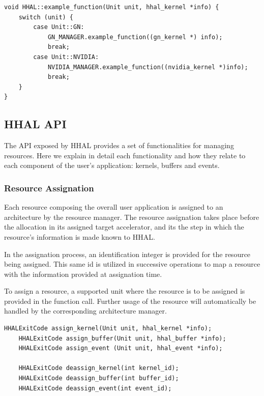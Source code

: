 \begin{lstlisting}[style=CStyle, caption=HHAL API Example - Dispatching architecture-specific structures]
void HHAL::example_function(Unit unit, hhal_kernel *info) {
    switch (unit) {
        case Unit::GN:
            GN_MANAGER.example_function((gn_kernel *) info);
            break;
        case Unit::NVIDIA:
            NVIDIA_MANAGER.example_function((nvidia_kernel *)info);
            break;
    }
}
\end{lstlisting}

\subsection{HHAL API}

The API exposed by HHAL provides a set of functionalities for managing resources. Here we explain in detail each functionality and how they relate to each component of the user's application: kernels, buffers and events.

\subsubsection{Resource Assignation}

Each resource composing the overall user application is assigned to an architecture by the resource manager. The resource assignation takes place before the allocation in its assigned target accelerator, and its the step in which the resource's information is made known to HHAL.

In the assignation process, an identification integer is provided for the resource being assigned. This same id is utilized in successive operations to map a resource with the information provided at assignation time.

To assign a resource, a supported unit where the resource is to be assigned is provided in the function call. Further usage of the resource will automatically be handled by the corresponding architecture manager.

\begin{lstlisting}[style=CStyle, caption=HHAL API - Assign functions]
    HHALExitCode assign_kernel(Unit unit, hhal_kernel *info);
    HHALExitCode assign_buffer(Unit unit, hhal_buffer *info);
    HHALExitCode assign_event (Unit unit, hhal_event *info);

    HHALExitCode deassign_kernel(int kernel_id);
    HHALExitCode deassign_buffer(int buffer_id);
    HHALExitCode deassign_event(int event_id);
\end{lstlisting}

